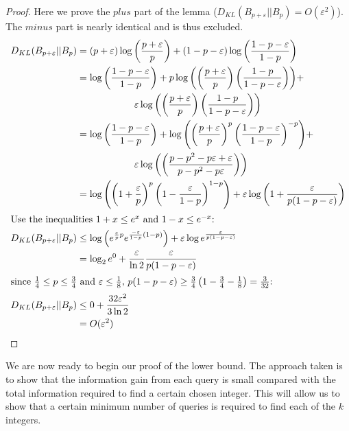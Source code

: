 \documentclass[12pt]{article}
\begin{document}
\begin{proof}
Here we prove the $plus$ part of the lemma ($D_{KL}(B_{p + \varepsilon}||B_p) = O(\varepsilon^2)$). The $minus$ part is nearly identical and is thus excluded.
\begin{align*}
D_{KL}(B_{p + \varepsilon}||B_p) &= (p + \varepsilon)\log{\left(\frac{p + \varepsilon}{p}\right)} + (1 - p - \varepsilon)\log{\left(\frac{1 - p - \varepsilon}{1 - p}\right)} \\
&=\log{\left(\frac{1-p-\varepsilon}{1-p}\right)} + p\log{\left(\left(\frac{p+\varepsilon}{p}\right)\left(\frac{1-p}{1-p-\varepsilon}\right)\right)} + \\ &\qquad\qquad\qquad\varepsilon\log{\left(\left(\frac{p+\varepsilon}{p}\right)\left(\frac{1-p}{1-p-\varepsilon}\right)\right)} \\
&=\log{\left(\frac{1-p-\varepsilon}{1-p}\right)} + \log{\left(\left(\frac{p+\varepsilon}{p}\right)^p\left(\frac{1-p-\varepsilon}{1-p}\right)^{-p}\right)} + \\ &\qquad\qquad\qquad\varepsilon\log{\left(\left(\frac{p-p^2-p\varepsilon+\varepsilon}{p-p^2-p\varepsilon}\right)\right)} \\
&=\log{\left(\left(1+\frac{\varepsilon}{p}\right)^p \left(1-\frac{\varepsilon}{1-p}\right)^{1-p}\right)} + \varepsilon\log{\left(1+\frac{\varepsilon}{p(1-p-\varepsilon)}\right)} \\
\intertext{Use the inequalities $1+x \leq e^x$ and $1-x \leq e^{-x}$:}
D_{KL}(B_{p + \varepsilon}||B_p) &\leq \log{\left(e^{\frac{\varepsilon}{p}p} e^{\frac{-\varepsilon}{1-p} (1-p)}\right)} + \varepsilon\log{e^{\frac{\varepsilon}{p(1-p-\varepsilon)}}} \\
&= \log_2{e^0} + \frac{\varepsilon}{\ln{2}} \frac{\varepsilon}{p(1-p-\varepsilon)} \\
\intertext{since $\frac{1}{4} \leq p \leq \frac{3}{4}$ and $\varepsilon \leq \frac{1}{8}$, $p(1-p-\varepsilon) \geq \frac{3}{4}\left(1-\frac{3}{4}-\frac{1}{8}\right) = \frac{3}{32}$:}
D_{KL}(B_{p + \varepsilon}||B_p) &\leq 0 + \frac{32\varepsilon^2}{3\ln{2}} \\
&= O(\varepsilon^2)  \qedhere
\end{align*} 
\end{proof} 

We are now ready to begin our proof of the lower bound. The approach taken is to show that the information gain from each query is small compared with the total information required to find a certain chosen integer. This will allow us to show that a certain minimum number of queries is required to find each of the $k$ integers.
\end{document}
